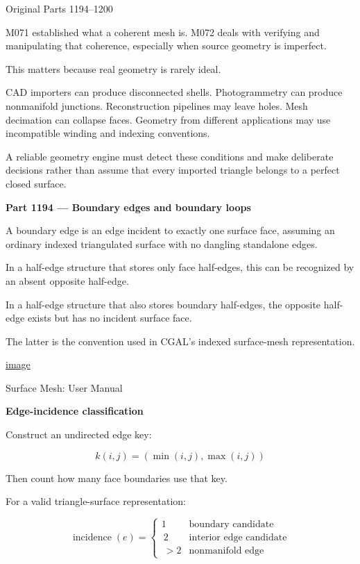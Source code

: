 \hypertarget{04-visual-computing-ii-ch023-part-v-m072-boundary-geometry-and-adjacency}{}

Original Parts 1194--1200

M071 established what a coherent mesh is. M072 deals with verifying and manipulating that coherence, especially when source geometry is imperfect.

This matters because real geometry is rarely ideal.

CAD importers can produce disconnected shells. Photogrammetry can produce nonmanifold junctions. Reconstruction pipelines may leave holes. Mesh decimation can collapse faces. Geometry from different applications may use incompatible winding and indexing conventions.

A reliable geometry engine must detect these conditions and make deliberate decisions rather than assume that every imported triangle belongs to a perfect closed surface.

\textbf{Part 1194 --- Boundary edges and boundary loops}

A boundary edge is an edge incident to exactly one surface face, assuming an ordinary indexed triangulated surface with no dangling standalone edges.

In a half-edge structure that stores only face half-edges, this can be recognized by an absent opposite half-edge.

In a half-edge structure that also stores boundary half-edges, the opposite half-edge exists but has no incident surface face.

The latter is the convention used in CGAL's indexed surface-mesh representation. 

\href{https://www.google.com/s2/favicons?domain=https://doc.cgal.org&sz=32}{image}

Surface Mesh: User Manual

\textbf{Edge-incidence classification}

Construct an undirected edge key:

\[
k(i,j)=(\min(i,j),\max(i,j))
\]

Then count how many face boundaries use that key.

For a valid triangle-surface representation:

\[
\operatorname{incidence}(e)= \begin{cases} 1 & \text{boundary candidate}\\\ 2 & \text{interior edge candidate}\\\ >2 & \text{nonmanifold edge} \end{cases}
\]

